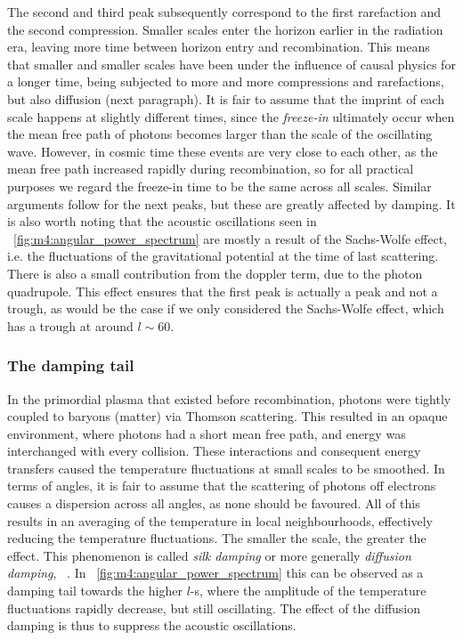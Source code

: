         The second and third peak subsequently correspond to the first rarefaction and the second compression. Smaller scales enter the horizon earlier in the radiation era, leaving more time between horizon entry and recombination. This means that smaller and smaller scales have been under the influence of causal physics for a longer time, being subjected to more and more compressions and rarefactions, but also diffusion (next paragraph). It is fair to assume that the imprint of each scale happens at slightly different times, since the \textit{freeze-in} ultimately occur when the mean free path of photons becomes larger than the scale of the oscillating wave. However, in cosmic time these events are very close to each other, as the mean free path increased rapidly during recombination, so for all practical purposes we regard the freeze-in time to be the same across all scales. Similar arguments follow for the next peaks, but these are greatly affected by damping. It is also worth noting that the acoustic oscillations seen in ~\cref{fig:m4:angular_power_spectrum} are mostly a result of the Sachs-Wolfe effect, i.e. the fluctuations of the gravitational potential at the time of last scattering. There is also a small contribution from the doppler term, due to the photon quadrupole. This effect ensures that the first peak is actually a peak and not a trough, as would be the case if we only considered the Sachs-Wolfe effect, which has a trough at around $l\sim 60$. 

    \subsubsection{The damping tail}
        In the primordial plasma that existed before recombination, photons were tightly coupled to baryons (matter) via Thomson scattering. This resulted in an opaque environment, where photons had a short mean free path, and energy was interchanged with every collision. These interactions and consequent energy transfers caused the temperature fluctuations at small scales to be smoothed. In terms of angles, it is fair to assume that the scattering of photons off electrons causes a dispersion across all angles, as none should be favoured. All of this results in an averaging of the temperature in local neighbourhoods, effectively reducing the temperature fluctuations. The smaller the scale, the greater the effect. This phenomenon is called \textit{silk damping} or more generally \textit{diffusion damping}, ~\cite{dodelson2020modern}. In ~\cref{fig:m4:angular_power_spectrum} this can be observed as a damping tail towards the higher $l$-s, where the amplitude of the temperature fluctuations rapidly decrease, but still oscillating. The effect of the diffusion damping is thus to suppress the acoustic oscillations. 

